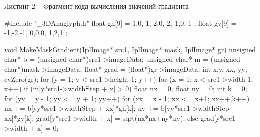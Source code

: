 \documentclass[a4paper,12pt]{article}
\begin{document}
\begin{center}
	Листинг 2 -- Фрагмент кода вычисления значений градиента
\end{center}

\begin{MyCode}
	
#include "_3DAnaglyph.h"
float gh[9] = {
	1,0,-1,
	2,0,-2,
	1,0,-1
};
float gv[9] = {
	-1,-2,-1,
	0,0,0,
	1,2,1
};

void MakeMaskGradient(IplImage* src1, IplImage* mask, IplImage* gr)
{
	unsigned char* b = (unsigned char*)src1->imageData;
	unsigned char* m = (unsigned char*)mask->imageData;
	float* grad = (float*)gr->imageData;
	int x,y, xx, yy;
	cvZero(gr);
	for (y = 1; y < src1->height-1; y++)
	for (x = 1; x < src1->width-1; x++)
	{
		if (m[y*src1->widthStep + x] > 0)
		{
			float nx = 0; 
			float ny = 0;
			int k  = 0;
			for (yy = y - 1; yy <= y + 1; yy++)
			{
				for (xx = x - 1; xx <= x+1; xx++,k++)
				{
					nx += b[yy*src1->widthStep +
					 xx]*gh[k];				
					ny += b[yy*src1->widthStep + 
					 xx]*gv[k];				
				}
			}
			grad[y*src1->width + x] = sqrt(nx*nx+ny*ny);
		}
		else
		grad[y*src1->width + x] = 0;
	}
}

\end{MyCode}
\end{document}
